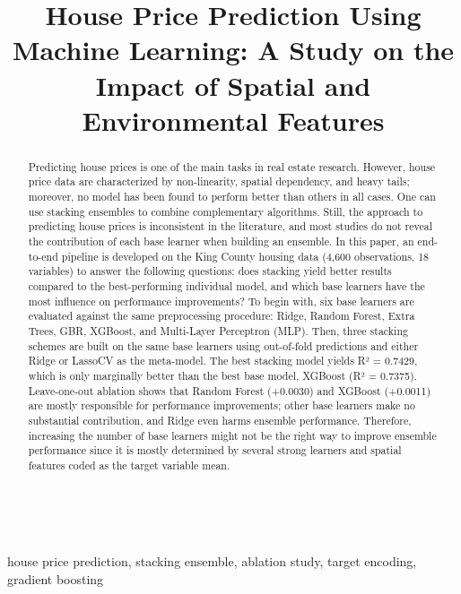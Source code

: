 \documentclass[conference]{IEEEtran}
\begin{document}
\title{House Price Prediction Using Machine Learning: A Study on the Impact of Spatial and Environmental Features}\\

\author{
}

\begin{abstract}
Predicting house prices is one of the main tasks in real estate research. However, house price data are characterized by non-linearity, spatial dependency, and heavy tails; moreover, no model has been found to perform better than others in all cases. One can use stacking ensembles to combine complementary algorithms. Still, the approach to predicting house prices is inconsistent in the literature, and most studies do not reveal the contribution of each base learner when building an ensemble. In this paper, an end-to-end pipeline is developed on the King County housing data (4,600 observations, 18 variables) to answer the following questions: does stacking yield better results compared to the best-performing individual model, and which base learners have the most influence on performance improvements? To begin with, six base learners are evaluated against the same preprocessing procedure: Ridge, Random Forest, Extra Trees, GBR, XGBoost, and Multi-Layer Perceptron (MLP). Then, three stacking schemes are built on the same base learners using out-of-fold predictions and either Ridge or LassoCV as the meta-model. The best stacking model yields R² = 0.7429, which is only marginally better than the best base model, XGBoost (R² = 0.7375). Leave-one-out ablation shows that Random Forest (+0.0030) and XGBoost (+0.0011) are mostly responsible for performance improvements; other base learners make no substantial contribution, and Ridge even harms ensemble performance. Therefore, increasing the number of base learners might not be the right way to improve ensemble performance since it is mostly determined by several strong learners and spatial features coded as the target variable mean.
\end{abstract}

\begin{IEEEkeywords}
house price prediction, stacking ensemble, ablation study, target encoding, gradient boosting
\end{IEEEkeywords}
\end{document}
